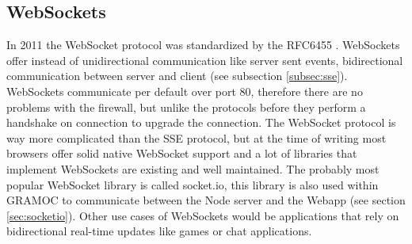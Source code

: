 \subsection{WebSockets}
In 2011 the WebSocket protocol was standardized by the RFC6455 \autocite{rfc6455}. WebSockets offer instead of unidirectional communication like server sent events, bidirectional communication between server and client (see subsection \vref{subsec:sse}). WebSockets communicate per default over port 80, therefore there are no problems with the firewall, but unlike the protocols before they perform a handshake on connection to upgrade the connection. The WebSocket protocol is way more complicated than the SSE protocol, but at the time of writing most browsers offer solid native WebSocket support and a lot of libraries that implement WebSockets are existing and well maintained. The probably most popular WebSocket library is called socket.io, this library is also used within GRAMOC to communicate between the Node server and the Webapp (see section \vref{sec:socketio}). Other use cases of WebSockets would be applications that rely on bidirectional real-time updates like games or chat applications.
